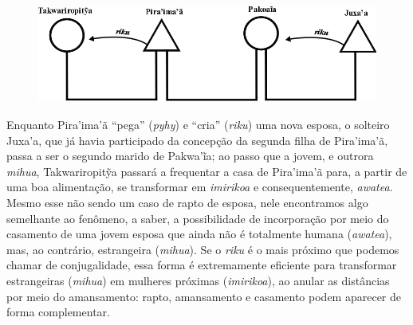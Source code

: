 \begin{figure}[H]
\centering
  \includegraphics[width=\textwidth]{./imgs/Figura_12}
\end{figure}



Enquanto Pira'ima'ã ``pega'' (\emph{pyhy}) e ``cria'' (\emph{riku}) uma nova
esposa, o solteiro Juxa'a, que já havia participado da concepção da
segunda filha de Pira'ima'ã, passa a ser o segundo marido de Pakwa'ĩa;
ao passo que a jovem, e outrora \emph{mihua}, Takwariropitỹa passará a
frequentar a casa de Pira'ima'ã para, a partir de uma boa alimentação,
se transformar em \emph{imirikoa} e consequentemente, \emph{awatea}.
Mesmo esse não sendo um caso de rapto de esposa, nele encontramos algo
semelhante ao fenômeno, a saber, a possibilidade de incorporação por
meio do casamento de uma jovem esposa que ainda não é totalmente humana
(\emph{awatea}), mas, ao contrário, estrangeira (\emph{mihua}). Se o
\emph{riku} é o mais próximo que podemos chamar de conjugalidade, essa
forma é extremamente eficiente para transformar estrangeiras
(\emph{mihua}) em mulheres próximas (\emph{imirikoa}), ao anular as
distâncias por meio do amansamento: rapto, amansamento e casamento podem
aparecer de forma complementar.

